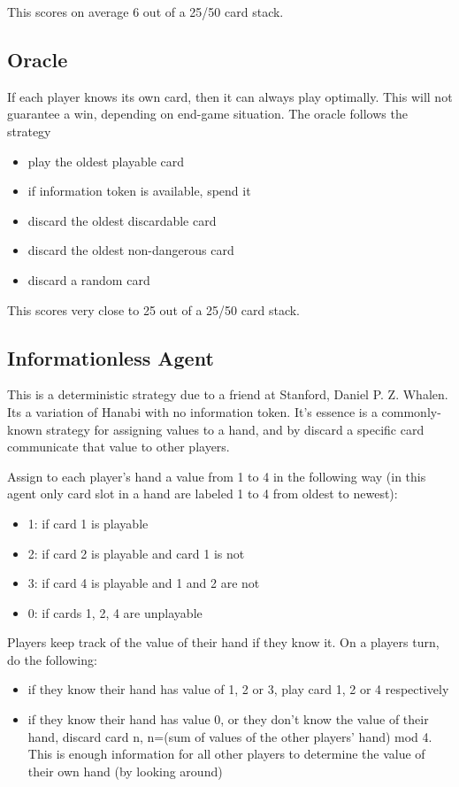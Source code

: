 \documentclass[12pt]{article}
\begin{document}
This scores on average 6 out of a 25/50 card stack.

\subsection{Oracle}
If each player knows its own card, then it can always play optimally. This will not guarantee a win, depending on end-game situation. The oracle follows the strategy
\begin{itemize}
 \item play the oldest playable card
 \item if information token is available, spend it
 \item discard the oldest discardable card
 \item discard the oldest non-dangerous card
 \item discard a random card
\end{itemize}
This scores very close to 25 out of a 25/50 card stack.

\subsection{Informationless Agent}
This is a deterministic strategy due to a friend at Stanford, Daniel P. Z. Whalen. Its a variation of Hanabi with no information token. It’s essence is a commonly-known strategy for assigning values to a hand, and by discard a specific card communicate that value to other players. 

Assign to each player’s hand a value from 1 to 4 in the following way (in this agent only card slot in a hand are labeled 1 to 4 from oldest to newest):
\begin{itemize}
 \item 1: if card 1 is playable
 \item 2: if card 2 is playable and card 1 is not
 \item 3: if card 4 is playable and 1 and 2 are not
 \item 0: if cards 1, 2, 4 are unplayable
\end{itemize}
Players keep track of the value of their hand if they know it. On a players turn, do the following:
\begin{itemize}
 \item if they know their hand has value of 1, 2 or 3, play card 1, 2 or 4 respectively
 \item if they know their hand has value 0, or they don’t know the value of their hand, discard
card n, n=(sum of values of the other players’ hand) mod 4. This is enough information
for all other players to determine the value of their own hand (by looking around)
\end{itemize} 
\end{document}
